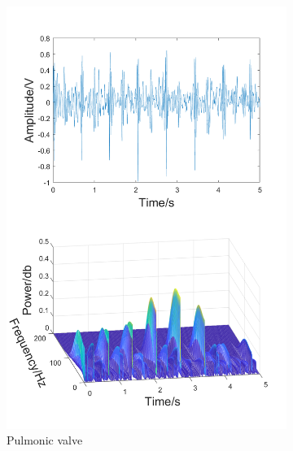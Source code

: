 \begin{figure}[htbp]
\begin{subfigure}{.3\linewidth}
        \includegraphics[width=1\linewidth]{figs/disscussion/c.png}
        \caption{Pulmonic valve}
        \label{FIG:Time&Frequency.c}
    \end{subfigure}\\
    \begin{subfigure}{.45\linewidth}
        \centering

\end{subfigure}
\end{figure}
